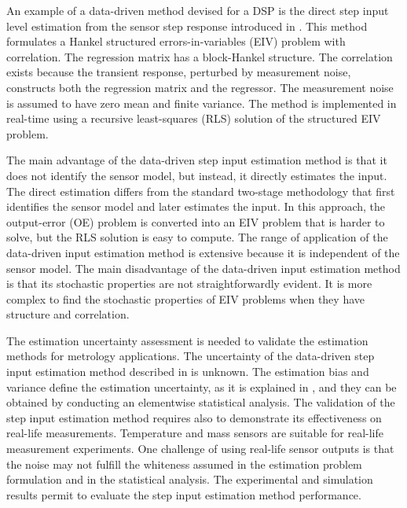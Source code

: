 An example of a data-driven method devised for a DSP is the direct step input level estimation from the sensor step response introduced in \citet{Markovsky15cep}.
This method formulates a Hankel structured errors-in-variables (EIV) problem with correlation.
The regression matrix has a block-Hankel structure.
The correlation exists because the transient response, perturbed by measurement noise, constructs both the regression matrix and the regressor.
The measurement noise is assumed to have zero mean and finite variance.
The method is implemented in real-time using a recursive least-squares (RLS) solution of the structured EIV problem.

The main advantage of the data-driven step input estimation method is that it does not identify the sensor model, but instead, it directly estimates the input. 
The direct estimation differs from the standard two-stage methodology that first identifies the sensor model and later estimates the input.
In this approach, the output-error (OE) problem is converted into an EIV problem that is harder to solve, but the RLS solution is easy to compute.
The range of application of the data-driven input estimation method is extensive because it is independent of the sensor model.
The main disadvantage of the data-driven input estimation method is that its stochastic properties are not straightforwardly evident. 
It is more complex to find the stochastic properties of EIV problems when they have structure and correlation.


The estimation uncertainty assessment is needed to validate the estimation methods for metrology applications.
The uncertainty of the data-driven step input estimation method described in \citet{Markovsky15ieee} is unknown.
The estimation bias and variance define the estimation uncertainty, as it is explained in \citet{Pintelon12Book}, and they can be obtained by conducting an elementwise statistical analysis. 
The validation of the step input estimation method requires also to demonstrate its effectiveness on real-life measurements.
Temperature and mass sensors are suitable for real-life measurement experiments.
One challenge of using real-life sensor outputs is that the noise may not fulfill the whiteness assumed in the estimation problem formulation and in the statistical analysis.
The experimental and simulation results permit to evaluate the step input estimation method performance.

